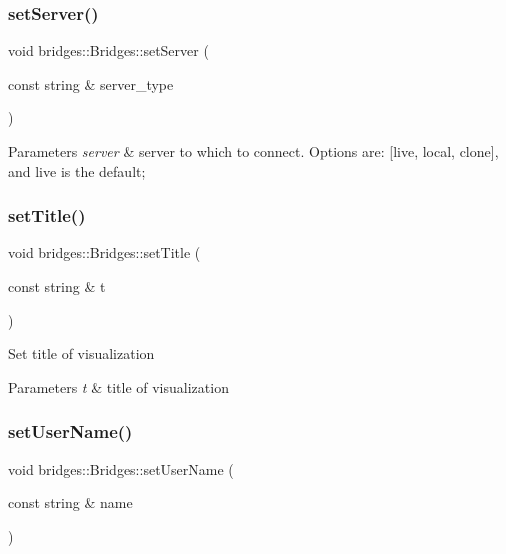\subsubsection{\texorpdfstring{setServer()}{setServer()}}
{\footnotesize\ttfamily void bridges\+::\+Bridges\+::set\+Server (\begin{DoxyParamCaption}\item[{const string \&}]{server\+\_\+type }\end{DoxyParamCaption})\hspace{0.3cm}{\ttfamily [inline]}}


\begin{DoxyParams}{Parameters}
{\em server} & server to which to connect. Options are\+: \mbox{[}\textquotesingle{}live\textquotesingle{}, \textquotesingle{}local\textquotesingle{}, \textquotesingle{}clone\textquotesingle{}\mbox{]}, and \textquotesingle{}live\textquotesingle{} is the default; \\
\hline
\end{DoxyParams}
\mbox{\label{classbridges_1_1_bridges_ac9f2e0b5fd5c70053db233dcbb636b56}} 
\subsubsection{\texorpdfstring{setTitle()}{setTitle()}}
{\footnotesize\ttfamily void bridges\+::\+Bridges\+::set\+Title (\begin{DoxyParamCaption}\item[{const string \&}]{t }\end{DoxyParamCaption})\hspace{0.3cm}{\ttfamily [inline]}}

Set title of visualization


\begin{DoxyParams}{Parameters}
{\em t} & title of visualization \\
\hline
\end{DoxyParams}
\mbox{\label{classbridges_1_1_bridges_ab0b00033e54d25968f5ecb61c31c7de3}} 
\subsubsection{\texorpdfstring{setUserName()}{setUserName()}}
{\footnotesize\ttfamily void bridges\+::\+Bridges\+::set\+User\+Name (\begin{DoxyParamCaption}\item[{const string \&}]{name }\end{DoxyParamCaption})\hspace{0.3cm}{\ttfamily [inline]}}


